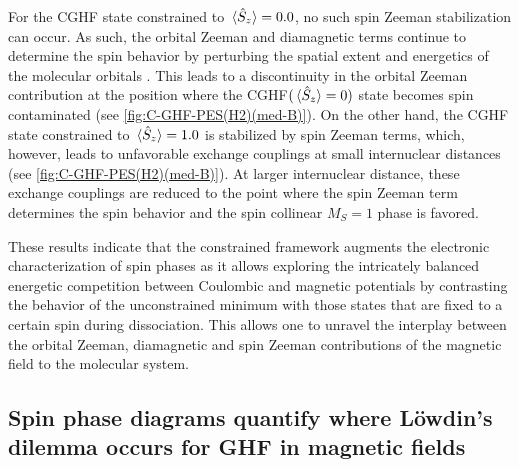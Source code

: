 \documentclass[journal=jctc,manuscript=article]{achemso}
\begin{document}
        For the CGHF state constrained to $\ev*{\hat{S}_z} = 0.0$, no such spin Zeeman stabilization can occur. As such, the orbital Zeeman and diamagnetic terms continue to determine the spin behavior by perturbing the spatial extent and energetics of the molecular orbitals \cite{Tellgren.2014, Sun.2019}. This leads to a discontinuity in the orbital Zeeman contribution at the position where the CGHF$(\ev*{\hat{S}_z}=0)$ state becomes spin contaminated (see \cref{fig:C-GHF-PES(H2)(med-B)}). On the other hand, the CGHF state constrained to $\ev*{\hat{S}_z} = 1.0$ is stabilized by spin Zeeman terms, which, however, leads to unfavorable exchange couplings at small internuclear distances (see \cref{fig:C-GHF-PES(H2)(med-B)}). At larger internuclear distance, these exchange couplings are reduced to the point where the spin Zeeman term determines the spin behavior and the spin collinear $M_S=1$ phase is favored.

        These results indicate that the constrained framework augments the electronic characterization of spin phases as it allows exploring the intricately balanced energetic competition between Coulombic and magnetic potentials by contrasting the behavior of the unconstrained minimum with those states that are fixed to a certain spin during dissociation. This allows one to unravel the interplay between the orbital Zeeman, diamagnetic and spin Zeeman contributions of the magnetic field to the molecular system.  
    
    \subsection{Spin phase diagrams quantify where Löwdin's dilemma occurs for GHF in magnetic fields}
\end{document}
